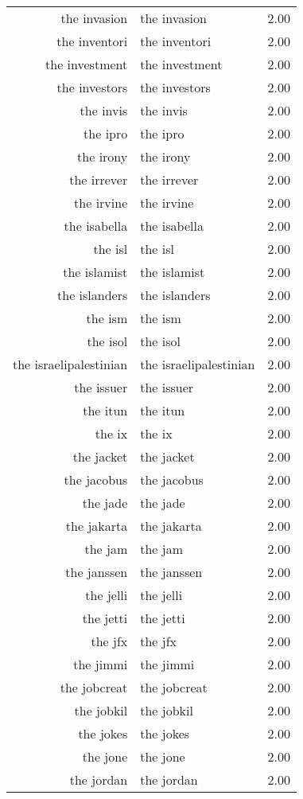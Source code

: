 \begin{table}[ht]
\begin{tabular}{rlr}
  the invasion & the invasion & 2.00 \\ 
  the inventori & the inventori & 2.00 \\ 
  the investment & the investment & 2.00 \\ 
  the investors & the investors & 2.00 \\ 
  the invis & the invis & 2.00 \\ 
  the ipro & the ipro & 2.00 \\ 
  the irony & the irony & 2.00 \\ 
  the irrever & the irrever & 2.00 \\ 
  the irvine & the irvine & 2.00 \\ 
  the isabella & the isabella & 2.00 \\ 
  the isl & the isl & 2.00 \\ 
  the islamist & the islamist & 2.00 \\ 
  the islanders & the islanders & 2.00 \\ 
  the ism & the ism & 2.00 \\ 
  the isol & the isol & 2.00 \\ 
  the israelipalestinian & the israelipalestinian & 2.00 \\ 
  the issuer & the issuer & 2.00 \\ 
  the itun & the itun & 2.00 \\ 
  the ix & the ix & 2.00 \\ 
  the jacket & the jacket & 2.00 \\ 
  the jacobus & the jacobus & 2.00 \\ 
  the jade & the jade & 2.00 \\ 
  the jakarta & the jakarta & 2.00 \\ 
  the jam & the jam & 2.00 \\ 
  the janssen & the janssen & 2.00 \\ 
  the jelli & the jelli & 2.00 \\ 
  the jetti & the jetti & 2.00 \\ 
  the jfx & the jfx & 2.00 \\ 
  the jimmi & the jimmi & 2.00 \\ 
  the jobcreat & the jobcreat & 2.00 \\ 
  the jobkil & the jobkil & 2.00 \\ 
  the jokes & the jokes & 2.00 \\ 
  the jone & the jone & 2.00 \\ 
  the jordan & the jordan & 2.00 \\ 

\end{tabular}
\end{table}
